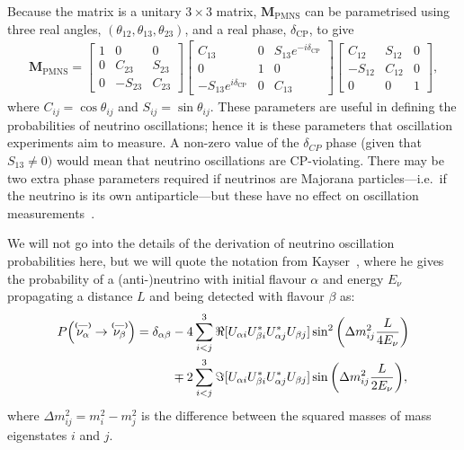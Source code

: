 \documentclass[aps,pra,12pt,notitlepage,tightenlines]{revtex4-1}
\newcommand\matr[1]{\bm{#1}}
\newcommand\barparen[1]{\overset{\textbf{\fontsize{5pt}{5pt}\selectfont(---)}}{#1}}
\begin{document}
Because the matrix is a unitary $3\times3$ matrix, $\matr{M}_\mathrm{PMNS}$ can be parametrised using three real angles, $(\theta_{12}, \theta_{13}, \theta_{23})$, and a real phase, $\delta_\mathrm{CP}$, to give
\begin{gather}
 \matr{M}_\mathrm{PMNS} = 
 \begin{bmatrix}
 1 & 0 & 0 \\
 0 & C_{23} & S_{23} \\
 0 & -S_{23} & C_{23}
 \end{bmatrix}
 \begin{bmatrix}
 C_{13} & 0 & S_{13}e^{-i\delta_\mathrm{CP}} \\
 0 & 1 & 0 \\
 -S_{13}e^{i\delta_\mathrm{CP}} & 0 & C_{13}
 \end{bmatrix}
 \begin{bmatrix}
 C_{12} & S_{12} & 0 \\
 -S_{12} & C_{12} & 0 \\
 0 & 0 & 1
 \end{bmatrix}
 ,
\end{gather}
where $C_{ij} = \cos\theta_{ij}$ and $S_{ij} = \sin\theta_{ij}$. These parameters are useful in defining the probabilities of neutrino oscillations; hence it is these parameters that oscillation experiments aim to measure. A non-zero value of the $\delta_{CP}$ phase (given that $S_{13}\neq 0)$ would mean that neutrino oscillations are CP-violating. There may be two extra phase parameters required if neutrinos are Majorana particles---i.e.\ if the neutrino is its own antiparticle---but these have no effect on oscillation measurements~\cite{Kayser:2005cd}.

We will not go into the details of the derivation of neutrino oscillation probabilities here, but we will quote the notation from Kayser~\cite{Kayser:2011jn}, where he gives the probability of a (anti-)neutrino with initial flavour $\alpha$ and energy $E_\nu$ propagating a distance $L$ and being detected with flavour $\beta$ as:
\begin{align}
\label{eq:p}
P\Big(\barparen{\nu_\alpha}\rightarrow\barparen{\nu_\beta}\Big) = \delta_{\alpha\beta}&-4\sum^3_{i<j}\Re[U_{\alpha i}U_{\beta i}^*U_{\alpha j}^*U_{\beta j}]\sin^2\bigg(\Delta m^2_{ij}\frac{L}{4E_\nu}\bigg) \notag \\
& \mp 2\sum^3_{i<j}\Im[U_{\alpha i}U_{\beta i}^*U_{\alpha j}^*U_{\beta j}]\sin\bigg(\Delta m^2_{ij}\frac{L}{2E_\nu}\bigg),
\end{align}
where $\Delta m^2_{ij} = m^2_i - m^2_j$ is the difference between the squared masses of mass eigenstates $i$ and $j$. 
\end{document}
